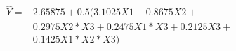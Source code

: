 

\[
\begin{array}{ll} \hat{Y} = & 2.65875 + 0.5(3.1025X1 - 0.8675X2 + \\ & 0.2975X2*X3 + 0.2475X1*X3 + 0.2125X3 + \\ & 0.1425X1*X2*X3) \end{array}
\]



